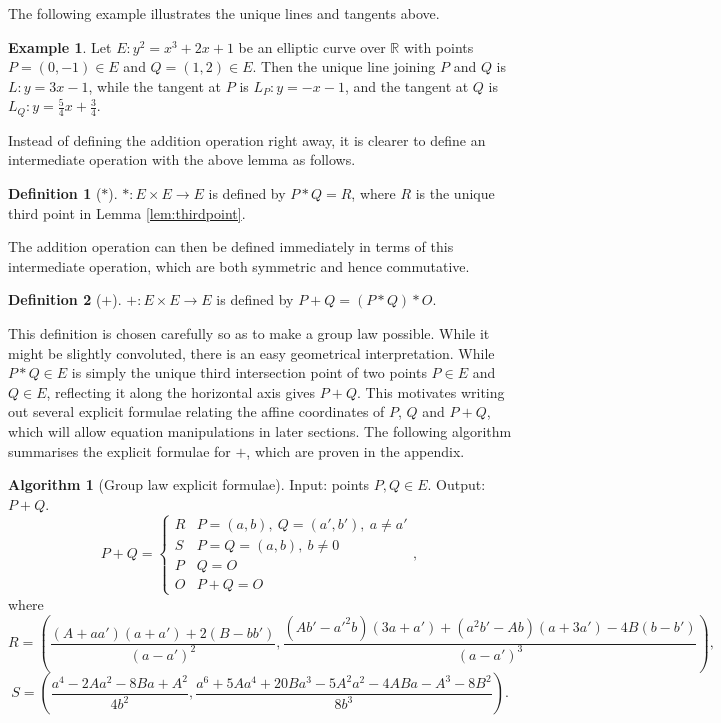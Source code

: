 \documentclass{article}
\newcommand{\R}{\mathbb{R}}
\newcommand{\rb}[1]{\left( #1 \right)}
\theoremstyle{definition}\newtheorem*{definition}{Definition}
\theoremstyle{definition}\newtheorem*{example}{Example}
\theoremstyle{definition}\newtheorem*{remark}{Remark}
\newtheorem{algorithm}[proposition]{Algorithm}
\begin{document}
The following example illustrates the unique lines and tangents above.

\begin{example}
Let $ E : y^2 = x^3 + 2x + 1 $ be an elliptic curve over $ \R $ with points $ P = \rb{0, -1} \in E $ and $ Q = \rb{1, 2} \in E $. Then the unique line joining $ P $ and $ Q $ is $ L : y = 3x - 1 $, while the tangent at $ P $ is $ L_P : y = -x - 1 $, and the tangent at $ Q $ is $ L_Q : y = \tfrac{5}{4}x + \tfrac{3}{4} $.
\end{example}

Instead of defining the addition operation right away, it is clearer to define an intermediate operation with the above lemma as follows.

\begin{definition}[$ * $]
$ * : E \times E \to E $ is defined by $ P * Q = R $, where $ R $ is the unique third point in Lemma \ref{lem:thirdpoint}.
\end{definition}

The addition operation can then be defined immediately in terms of this intermediate operation, which are both symmetric and hence commutative.

\begin{definition}[$ + $]
$ + : E \times E \to E $ is defined by $ P + Q = \rb{P * Q} * O $.
\end{definition}

This definition is chosen carefully so as to make a group law possible. While it might be slightly convoluted, there is an easy geometrical interpretation. While $ P * Q \in E $ is simply the unique third intersection point of two points $ P \in E $ and $ Q \in E $, reflecting it along the horizontal axis gives $ P + Q $. This motivates writing out several explicit formulae relating the affine coordinates of $ P $, $ Q $ and $ P + Q $, which will allow equation manipulations in later sections. The following algorithm summarises the explicit formulae for $ + $, which are proven in the appendix.

\begin{algorithm}[Group law explicit formulae]
Input: points $ P, Q \in E $. Output: $ P + Q $.
$$ P + Q = \begin{cases} R & P = \rb{a, b}, \ Q = \rb{a', b'}, \ a \ne a' \\ S & P = Q = \rb{a, b}, \ b \ne 0 \\ P & Q = O \\ O & P + Q = O \end{cases}, $$
where
$$ R = \rb{\dfrac{\rb{A + aa'}\rb{a + a'} + 2\rb{B - bb'}}{\rb{a - a'}^2}, \dfrac{\rb{Ab' - a'^2b}\rb{3a + a'} + \rb{a^2b' - Ab}\rb{a + 3a'} - 4B\rb{b - b'}}{\rb{a - a'}^3}}, $$
$$ S = \rb{\dfrac{a^4 - 2Aa^2 - 8Ba + A^2}{4b^2}, \dfrac{a^6 + 5Aa^4 + 20Ba^3 - 5A^2a^2 - 4ABa - A^3 - 8B^2}{8b^3}}. $$
\end{algorithm}
\end{document}
